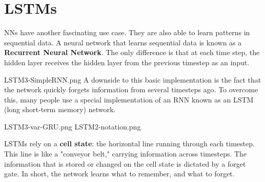 \documentclass[]{article}
\begin{document}
\section{LSTMs}

NNs have another fascinating use case. They are also able to learn patterns in sequential data. A neural network that learns sequential data is known as a \textbf{Recurrent Neural Network}. The only difference is that at each time step, the hidden layer receives the hidden layer from the previous timestep as an input.

  LSTM3-SimpleRNN.png
A downside to this basic implementation is the fact that the network quickly forgets information from several timesteps ago. To overcome this, many people use a special implementation of an RNN known as an LSTM (long short-term memory) network.

  LSTM3-var-GRU.png
  LSTM2-notation.png
  
LSTMs rely on a \textbf{cell state}: the horizontal line running through each timestep. This line is like a "conveyor belt," carrying information across timesteps. The information that is stored or changed on the cell state is dictated by a forget gate. In short, the network learns what to remember, and what to forget.
\end{document}
